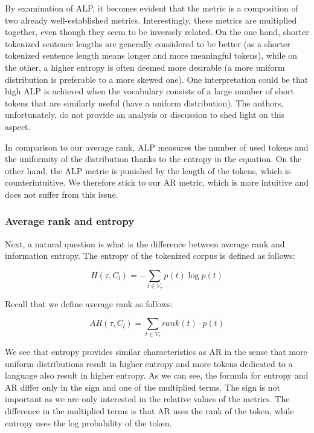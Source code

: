 By examination of ALP, it becomes evident that the metric is a composition of two already well-established metrics. Interestingly, these metrics are multiplied together, even though they seem to be inversely related. On the one hand, shorter tokenized sentence lengths are generally considered to be better (as a shorter tokenized sentence length means longer and more meaningful tokens), while on the other, a higher entropy is often deemed more desirable (a more uniform distribution is preferable to a more skewed one). One interpretation could be that high ALP is achieved when the vocabulary consists of a large number of short tokens that are similarly useful (have a uniform distribution). The authors, unfortunately, do not provide an analysis or discussion to shed light on this aspect. %

In comparison to our average rank, ALP measures the number of used tokens and the uniformity of the distribution thanks to the entropy in the equation. On the other hand, the ALP metric is punished by the length of the tokens, which is counterintuitive. We therefore stick to our AR metric, which is more intuitive and does not suffer from this issue.


\subsubsection{Average rank and entropy}

Next, a natural question is what is the difference between average rank and information entropy. The entropy of the tokenized corpus is defined as follows:

\begin{equation}
    H(\tau, C_l) = - \sum_{t \in V_\tau} p(t) \log p(t)
\end{equation}

Recall that we define average rank as follows:

\begin{equation}
    AR(\tau, C_l) = \sum_{t \in V_\tau} rank(t) \cdot p(t)
\end{equation}

We see that entropy provides similar characteristics as AR in the sense that more uniform distributions result in higher entropy and more tokens dedicated to a language also result in higher entropy. As we can see, the formula for entropy and AR differ only in the sign and one of the multiplied terms. The sign is not important as we are only interested in the relative values of the metrics. The difference in the multiplied terms is that AR uses the rank of the token, while entropy uses the log probability of the token. 

